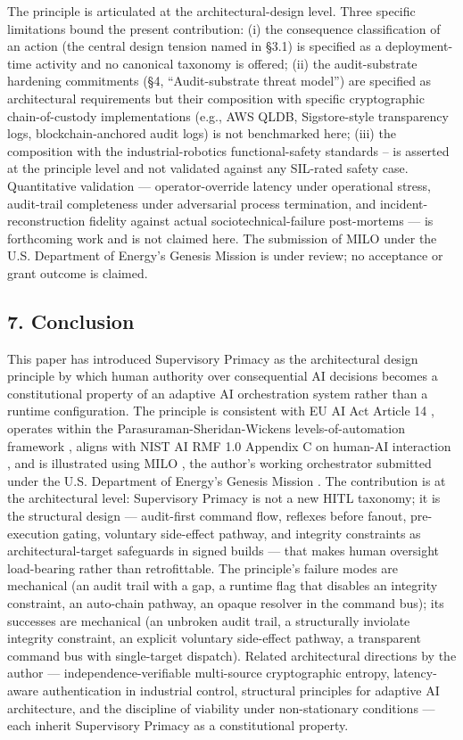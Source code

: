 The principle is articulated at the architectural-design level. Three
specific limitations bound the present contribution: (i) the consequence
classification of an action (the central design tension named in §3.1)
is specified as a deployment-time activity and no canonical taxonomy is
offered; (ii) the audit-substrate hardening commitments (§4,
``Audit-substrate threat model'') are specified as architectural
requirements but their composition with specific cryptographic
chain-of-custody implementations (e.g., AWS QLDB, Sigstore-style
transparency logs, blockchain-anchored audit logs) is not benchmarked
here; (iii) the composition with the industrial-robotics
functional-safety standards \cite{ref11}--\cite{ref14} is asserted at the
principle level and not validated against any SIL-rated safety case.
Quantitative validation --- operator-override latency under operational
stress, audit-trail completeness under adversarial process termination,
and incident-reconstruction fidelity against actual
sociotechnical-failure post-mortems --- is forthcoming work and is not
claimed here. The submission of MILO under the U.S. Department of
Energy's Genesis Mission \cite{ref4} is under review; no acceptance or grant
outcome is claimed.

\subsection{7. Conclusion}\label{conclusion}

This paper has introduced Supervisory Primacy as the architectural
design principle by which human authority over consequential AI
decisions becomes a constitutional property of an adaptive AI
orchestration system rather than a runtime configuration. The principle
is consistent with EU AI Act Article 14 \cite{ref1}, operates within the
Parasuraman-Sheridan-Wickens levels-of-automation framework \cite{ref2},
aligns with NIST AI RMF 1.0 Appendix C on human-AI interaction \cite{ref9},
and is illustrated using MILO \cite{ref3}, the author's working orchestrator
submitted under the U.S. Department of Energy's Genesis Mission \cite{ref4}.
The contribution is at the architectural level: Supervisory Primacy is
not a new HITL taxonomy; it is the structural design --- audit-first
command flow, reflexes before fanout, pre-execution gating, voluntary
side-effect pathway, and integrity constraints as architectural-target
safeguards in signed builds --- that makes human oversight load-bearing
rather than retrofittable. The principle's failure modes are mechanical
(an audit trail with a gap, a runtime flag that disables an integrity
constraint, an auto-chain pathway, an opaque resolver in the command
bus); its successes are mechanical (an unbroken audit trail, a
structurally inviolate integrity constraint, an explicit voluntary
side-effect pathway, a transparent command bus with single-target
dispatch). Related architectural directions by the author ---
independence-verifiable multi-source cryptographic entropy,
latency-aware authentication in industrial control, structural
principles for adaptive AI architecture, and the discipline of viability
under non-stationary conditions --- each inherit Supervisory Primacy as
a constitutional property.

